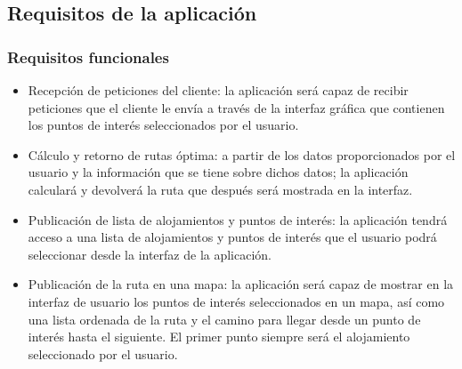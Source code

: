 \subsection[Requisitos internos]{Requisitos de la aplicación}
\subsubsection[Requisitos funcionales]{Requisitos funcionales}
\begin{itemize}
	\item Recepción de peticiones del cliente: la aplicación será capaz de recibir peticiones que el cliente le envía a través de la interfaz gráfica que contienen los puntos de interés seleccionados por el usuario.
	\item Cálculo y retorno de rutas óptima: a partir de los datos proporcionados por el usuario y la información que se tiene sobre dichos datos; la aplicación calculará y devolverá la ruta que después será mostrada en la interfaz.
	\item Publicación de lista de alojamientos y puntos de interés: la aplicación tendrá acceso a una lista de alojamientos y puntos de interés que el usuario podrá seleccionar desde la interfaz de la aplicación.
	\item Publicación de la ruta en una mapa: la aplicación será capaz de mostrar en la interfaz de usuario los puntos de interés seleccionados en un mapa, así como una lista ordenada de la ruta y el camino para llegar desde un punto de interés hasta el siguiente. El primer punto siempre será el alojamiento seleccionado por el usuario.
\end{itemize}
